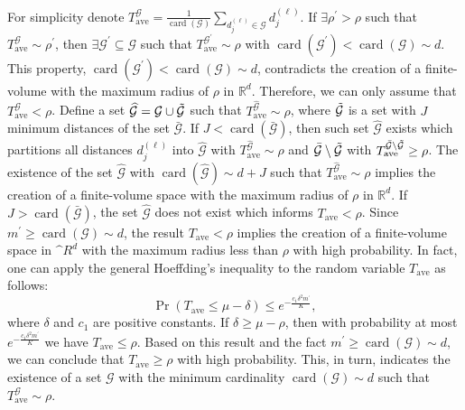 \documentclass[12pt,draftcls,onecolumn]{IEEEtran}
\begin{document}
\begin{IEEEproof}
For simplicity denote $T_{\mathrm{ave}}^{\mathcal{G}}=\frac{1}{\operatorname{card}(\mathcal{G})}\sum_{d_j^{(\ell)}\in\mathcal{G}}d_j^{(\ell)}$. If $\exists\rho^{\prime}>\rho$ such that $T_{\mathrm{ave}}^{\mathcal{G}}\sim\rho^{\prime}$, then $\exists\mathcal{G}^{\prime}\subseteq\mathcal{G}$ such that $T_{\mathrm{ave}}^{\mathcal{G}^{\prime}}\sim\rho$ with $\operatorname{card}\left(\mathcal{G}^{\prime}\right)<\operatorname{card}\left(\mathcal{G}\right)\sim d$. This property, $\operatorname{card}\left(\mathcal{G}^{\prime}\right)<\operatorname{card}\left(\mathcal{G}\right)\sim d$, contradicts the creation of a finite-volume with the maximum radius of $\rho$ in $\mathbb{R}^d$. Therefore, we can only assume that $T_{\mathrm{ave}}^{\mathcal{G}}<\rho$. Define a set $\widehat{\mathcal{G}}=\mathcal{G}\cup\Tilde{\mathcal{G}}$ such that $T_{\mathrm{ave}}^{\widehat{\mathcal{G}}}\sim\rho$, where $\Tilde{\mathcal{G}}$ is a set with $J$ minimum distances of the set $\bar{\mathcal{G}}$. If $J<\operatorname{card}(\bar{\mathcal{G}})$, then such set $\widehat{\mathcal{G}}$ exists which partitions all distances $d_j^{(\ell)}$ into $\widehat{\mathcal{G}}$ with $T_{\mathrm{ave}}^{\widehat{\mathcal{G}}}\sim\rho$ and $\bar{\mathcal{G}}\setminus\Tilde{\mathcal{G}}$ with $T_{\mathrm{ave}}^{\bar{\mathcal{G}}\setminus\Tilde{\mathcal{G}}}\geq\rho$. The existence of the set $\widehat{\mathcal{G}}$ with $\operatorname{card}(\widehat{\mathcal{G}})\sim d+J$ such that $T_{\mathrm{ave}}^{\widehat{\mathcal{G}}}\sim\rho$ implies the creation of a finite-volume space with the maximum radius of $\rho$ in $\mathbb{R}^d$. If $J>\operatorname{card}(\bar{\mathcal{G}})$, the set $\widehat{\mathcal{G}}$ does not exist which informs $T_{\mathrm{ave}}<\rho$. Since $m^{\prime}\geq\operatorname{card}\left(\mathcal{G}\right)\sim d$, the result $T_{\mathrm{ave}}<\rho$ implies the creation of a finite-volume space in $\mathbb^{R}^d$ with the maximum radius less than $\rho$ with high probability. In fact, one can apply
the general Hoeffding's inequality \cite[Theorem~2.6.2]{vershynin2018high}
to the random variable $T_{\mathrm{ave}}$ as follows:
\begin{equation}
\label{gaur}
\operatorname{Pr}\left(T_{\mathrm{ave}}\leq\mu-\delta\right)\leq e^{-\frac{c_1\delta^2 m^{\prime}}{K}},
\end{equation}
where $\delta$ and $c_1$ are positive constants. If $\delta\geq\mu-\rho$,
then with probability at most $e^{-\frac{c_1\delta^2 m^{\prime}}{K}}$ we have $T_{\mathrm{ave}}\leq\rho$.
Based on this result and the fact $m^{\prime}\geq\operatorname{card}\left(\mathcal{G}\right)\sim d$, we can conclude that $T_{\mathrm{ave}}\geq\rho$ with high probability. This, in turn, indicates the existence of a set $\mathcal{G}$ with the minimum cardinality $\operatorname{card}(\mathcal{G})\sim d$ such that $T_{\mathrm{ave}}^{\mathcal{G}}\sim\rho$.
\end{IEEEproof}
\end{document}

